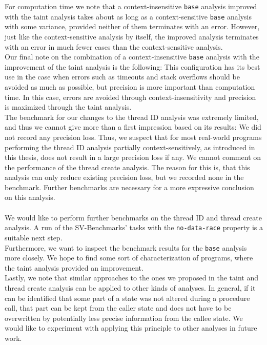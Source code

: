   For computation time we note that a context-insensitive \texttt{base} analysis improved with the taint analysis takes about as long as a context-sensitive \texttt{base} analysis with some variance, provided neither of them terminates with an error. However, just like the context-sensitive analysis by itself, the improved analysis terminates with an error in much fewer cases than the context-sensitive analysis.\\
  Our final note on the combination of a context-insensitive \texttt{base} analysis with the improvement of the taint analysis is the following: This configuration has its best use in the case when errors such as timeouts and stack overflows should be avoided as much as possible, but precision is more important than computation time. In this case, errors are avoided through context-insensitivity and precision is maximized through the taint analysis.\\
  The benchmark for our changes to the thread ID analysis was extremely limited, and thus we cannot give more than a first impression based on its results: We did not record any precision loss. Thus, we suspect that for most real-world programs performing the thread ID analysis partially context-sensitively, as introduced in this thesis, does not result in a large precision loss if any. We cannot comment on the performance of the thread create analysis. The reason for this is, that this analysis can only reduce existing precision loss, but we recorded none in the benchmark. Further benchmarks are necessary for a more expressive conclusion on this analysis.\\
  \\
  We would like to perform further benchmarks on the thread ID and thread create analysis. A run of the SV-Benchmarks' tasks with the \texttt{no-data-race} property is a suitable next step.\\
  Furthermore, we want to inspect the benchmark results for the \texttt{base} analysis more closely. We hope to find some sort of characterization of programs, where the taint analysis provided an improvement.\\
  Lastly, we note that similar approaches to the ones we proposed in the taint and thread create analysis can be applied to other kinds of analyses. In general, if it can be identified that some part of a state was not altered during a procedure call, that part can be kept from the caller state and does not have to be overwritten by potentially less precise information from the callee state. We would like to experiment with applying this principle to other analyses in future work.\\
